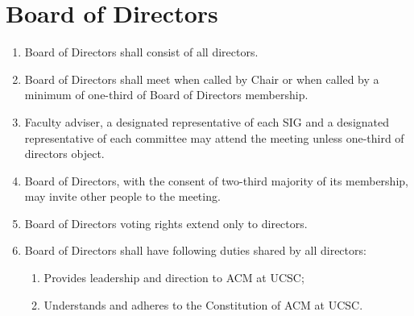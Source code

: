 \section{Board of Directors}
\begin{enumerate}
		\item Board of Directors shall consist of all directors.
		\item Board of Directors shall meet when called by Chair or when called by a minimum of one-third of Board of Directors membership.
		\item Faculty adviser, a designated representative of each SIG and a designated representative of each committee may attend the meeting unless one-third of directors object.
		\item Board of Directors, with the consent of two-third majority of its membership, may invite other people to the meeting.
		\item Board of Directors voting rights extend only to directors.
		\item Board of Directors shall have following duties shared by all directors:
		\begin{enumerate}
			\item Provides leadership and direction to ACM at UCSC;
			\item Understands and adheres to the Constitution of ACM at UCSC.
		\end{enumerate}
\end{enumerate}

